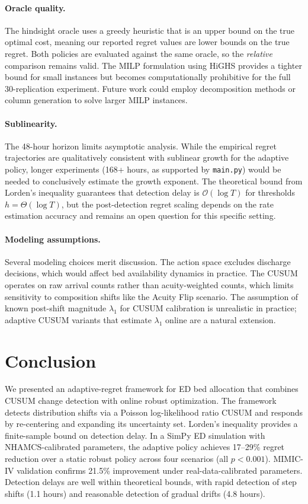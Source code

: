 \documentclass[11pt,twocolumn]{article}
\theoremstyle{plain}
\theoremstyle{definition}
\begin{document}
\paragraph{Oracle quality.} The hindsight oracle uses a greedy heuristic that is an upper bound on the true optimal cost, meaning our reported regret values are lower bounds on the true regret. Both policies are evaluated against the same oracle, so the \emph{relative} comparison remains valid. The MILP formulation using HiGHS provides a tighter bound for small instances but becomes computationally prohibitive for the full 30-replication experiment. Future work could employ decomposition methods or column generation to solve larger MILP instances.

\paragraph{Sublinearity.} The 48-hour horizon limits asymptotic analysis. While the empirical regret trajectories are qualitatively consistent with sublinear growth for the adaptive policy, longer experiments (168+ hours, as supported by \texttt{main.py}) would be needed to conclusively estimate the growth exponent. The theoretical bound from Lorden's inequality guarantees that detection delay is $\mathcal{O}(\log T)$ for thresholds $h = \Theta(\log T)$, but the post-detection regret scaling depends on the rate estimation accuracy and remains an open question for this specific setting.

\paragraph{Modeling assumptions.} Several modeling choices merit discussion. The action space excludes discharge decisions, which would affect bed availability dynamics in practice. The CUSUM operates on raw arrival counts rather than acuity-weighted counts, which limits sensitivity to composition shifts like the Acuity Flip scenario. The assumption of known post-shift magnitude $\lambda_1$ for CUSUM calibration is unrealistic in practice; adaptive CUSUM variants that estimate $\lambda_1$ online are a natural extension.

\section{Conclusion}

We presented an adaptive-regret framework for ED bed allocation that combines CUSUM change detection with online robust optimization. The framework detects distribution shifts via a Poisson log-likelihood ratio CUSUM and responds by re-centering and expanding its uncertainty set. Lorden's inequality provides a finite-sample bound on detection delay. In a SimPy ED simulation with NHAMCS-calibrated parameters, the adaptive policy achieves 17--29\% regret reduction over a static robust policy across four scenarios (all $p < 0.001$). MIMIC-IV validation confirms 21.5\% improvement under real-data-calibrated parameters. Detection delays are well within theoretical bounds, with rapid detection of step shifts (1.1 hours) and reasonable detection of gradual drifts (4.8 hours).
\end{document}
